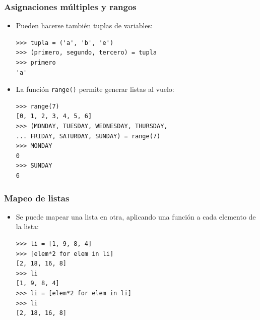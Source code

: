 \begin{frame}[fragile]
\frametitle{Asignaciones múltiples y rangos}

\begin{itemize}
\item Pueden hacerse también tuplas de variables:
\begin{footnotesize}
\begin{verbatim}
>>> tupla = ('a', 'b', 'e')
>>> (primero, segundo, tercero) = tupla
>>> primero
'a'
\end{verbatim}
\end{footnotesize}

\item La función \verb|range()| permite generar listas al vuelo:
\begin{footnotesize}
\begin{verbatim}
>>> range(7)
[0, 1, 2, 3, 4, 5, 6]
>>> (MONDAY, TUESDAY, WEDNESDAY, THURSDAY, 
... FRIDAY, SATURDAY, SUNDAY) = range(7)
>>> MONDAY
0
>>> SUNDAY
6
\end{verbatim}
\end{footnotesize}
\end{itemize}

\end{frame}



\begin{frame}[fragile]
\frametitle{Mapeo de listas}

\begin{itemize}
\item Se puede mapear una lista en otra, aplicando una función a cada
  elemento de la lista:
  \begin{footnotesize}
\begin{verbatim}
>>> li = [1, 9, 8, 4]
>>> [elem*2 for elem in li]      
[2, 18, 16, 8]
>>> li                           
[1, 9, 8, 4]
>>> li = [elem*2 for elem in li] 
>>> li
[2, 18, 16, 8]
\end{verbatim}
  \end{footnotesize}
\end{itemize}
  
\end{frame}


